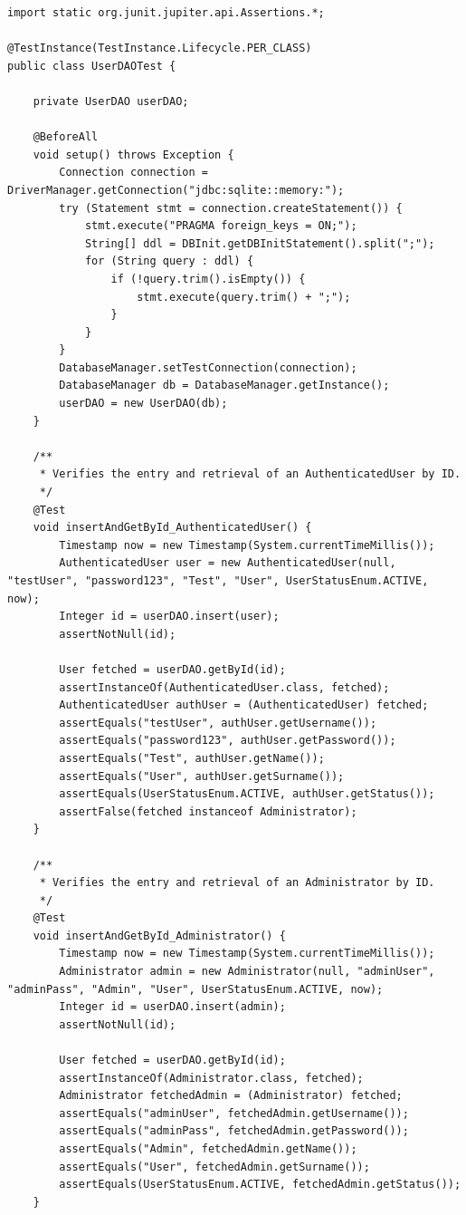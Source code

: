 \documentclass[a4paper]{article}
\begin{document}
\begin{lstlisting}[style=java-style, caption={Esempio test per la classe \texttt{UserTest.java}}]
import static org.junit.jupiter.api.Assertions.*;

@TestInstance(TestInstance.Lifecycle.PER_CLASS)
public class UserDAOTest {

    private UserDAO userDAO;

    @BeforeAll
    void setup() throws Exception {
        Connection connection = DriverManager.getConnection("jdbc:sqlite::memory:");
        try (Statement stmt = connection.createStatement()) {
            stmt.execute("PRAGMA foreign_keys = ON;");
            String[] ddl = DBInit.getDBInitStatement().split(";");
            for (String query : ddl) {
                if (!query.trim().isEmpty()) {
                    stmt.execute(query.trim() + ";");
                }
            }
        }
        DatabaseManager.setTestConnection(connection);
        DatabaseManager db = DatabaseManager.getInstance();
        userDAO = new UserDAO(db);
    }

    /**
     * Verifies the entry and retrieval of an AuthenticatedUser by ID.
     */
    @Test
    void insertAndGetById_AuthenticatedUser() {
        Timestamp now = new Timestamp(System.currentTimeMillis());
        AuthenticatedUser user = new AuthenticatedUser(null, "testUser", "password123", "Test", "User", UserStatusEnum.ACTIVE, now);
        Integer id = userDAO.insert(user);
        assertNotNull(id);

        User fetched = userDAO.getById(id);
        assertInstanceOf(AuthenticatedUser.class, fetched);
        AuthenticatedUser authUser = (AuthenticatedUser) fetched;
        assertEquals("testUser", authUser.getUsername());
        assertEquals("password123", authUser.getPassword());
        assertEquals("Test", authUser.getName());
        assertEquals("User", authUser.getSurname());
        assertEquals(UserStatusEnum.ACTIVE, authUser.getStatus());
        assertFalse(fetched instanceof Administrator);
    }

    /**
     * Verifies the entry and retrieval of an Administrator by ID.
     */
    @Test
    void insertAndGetById_Administrator() {
        Timestamp now = new Timestamp(System.currentTimeMillis());
        Administrator admin = new Administrator(null, "adminUser", "adminPass", "Admin", "User", UserStatusEnum.ACTIVE, now);
        Integer id = userDAO.insert(admin);
        assertNotNull(id);

        User fetched = userDAO.getById(id);
        assertInstanceOf(Administrator.class, fetched);
        Administrator fetchedAdmin = (Administrator) fetched;
        assertEquals("adminUser", fetchedAdmin.getUsername());
        assertEquals("adminPass", fetchedAdmin.getPassword());
        assertEquals("Admin", fetchedAdmin.getName());
        assertEquals("User", fetchedAdmin.getSurname());
        assertEquals(UserStatusEnum.ACTIVE, fetchedAdmin.getStatus());
    }


\end{lstlisting}
\end{document}
